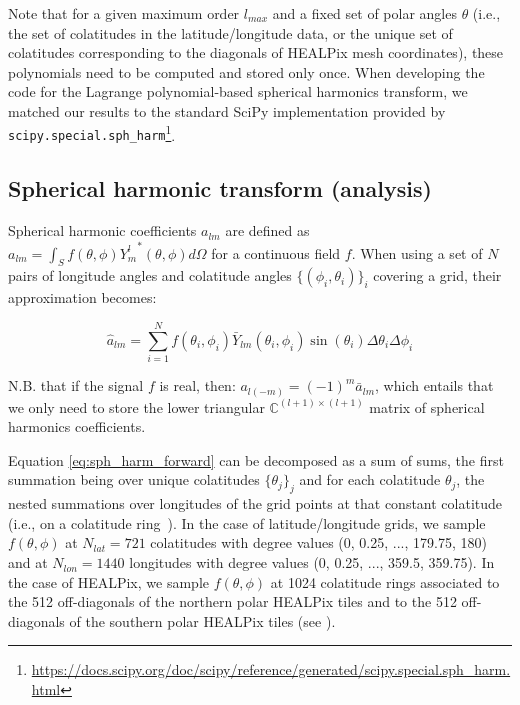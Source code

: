 \documentclass[11pt, a4paper, logo, copyright, numbering]{googledeepmind}
\begin{document}
Note that for a given maximum order $l_{max}$ and a fixed set of polar angles $\theta$ (i.e., the set of colatitudes in the latitude/longitude data, or the unique set of colatitudes corresponding to the diagonals of HEALPix mesh coordinates), these polynomials need to be computed and stored only once. When developing the code for the Lagrange polynomial-based spherical harmonics transform, we matched our results to the standard SciPy implementation provided by {\tt scipy.special.sph\_harm}\footnote{\url{https://docs.scipy.org/doc/scipy/reference/generated/scipy.special.sph\_harm.html}}.

\subsection{Spherical harmonic transform (analysis)}

Spherical harmonic coefficients $a_{lm}$ are defined as
$a_{lm} = \int_{S} f(\theta, \phi) {Y_m^l}^*(\theta, \phi) d\Omega$ for a continuous field $f$. When using a set of $N$ pairs of longitude angles and colatitude angles $\{(\phi_i, \theta_i)\}_i$ covering a grid, their approximation becomes:

\begin{equation}
\hat{a}_{lm} = \sum_{i=1}^N f(\theta_i, \phi_i) \bar{Y}_{lm}(\theta_i, \phi_i) \sin(\theta_i)\Delta\theta_i\Delta\phi_i
\label{eq:sph_harm_forward}
\end{equation}

N.B. that if the signal $f$ is real, then: $a_{l(-m)} = (-1)^m \bar{a}_{lm}$, which entails that we only need to store the lower triangular $\mathbb{C} ^{(l+1) \times (l+1)}$ matrix of spherical harmonics coefficients.

Equation \ref{eq:sph_harm_forward} can be decomposed as a sum of sums, the first summation being over unique colatitudes $\{\theta_j\}_j$ and for each colatitude $\theta_j$, the nested summations over longitudes of the grid points at that constant colatitude (i.e., on a colatitude ring~\citep{willmert2022ring}). In the case of latitude/longitude grids, we sample $f(\theta, \phi)$ at $N_{lat}=721$ colatitudes with degree values (0, 0.25, ..., 179.75, 180) and at $N_{lon}=1440$ longitudes with degree values (0, 0.25, ..., 359.5, 359.75). In the case of HEALPix, we sample $f(\theta, \phi)$ at 1024 colatitude rings associated to the 512 off-diagonals of the northern polar HEALPix tiles and to the 512 off-diagonals of the southern polar HEALPix tiles (see \citet{willmert2022ring}).
\end{document}
